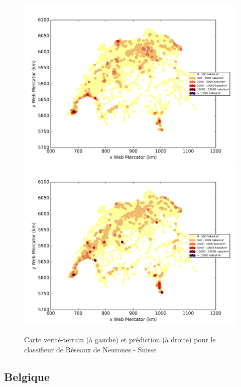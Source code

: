 \documentclass{book}
\begin{document}
\begin{figure}[H]
\centerline{
\includegraphics[scale=0.5]{../../data/Suisse/test/Neural_Network_Classification-oversampling/Neural_Network_Classification-oversampling/density_ground_truth.png}
\includegraphics[scale=0.5]{../../data/Suisse/test/Neural_Network_Classification-oversampling/Neural_Network_Classification-oversampling/density_classification.png}
}
\caption{Carte verité-terrain (à gauche) et prédiction (à droite) pour le classifieur de Réseaux de Neurones - Suisse}
\label{nn_carte_suisse}
\end{figure}


\subsection{Belgique}
\end{document}
